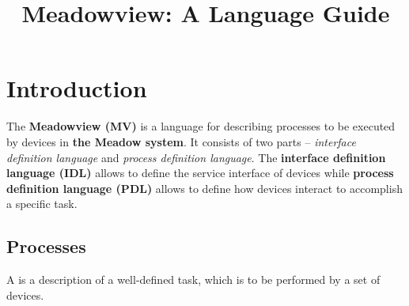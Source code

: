 \documentclass{myproc}
\begin{document}
\small

\title{\large\bf \textcolor{blue2}{Meadowview:  A Language Guide}}  
\date{}
\maketitle

\section{Introduction}


The \textcolor{blue2}{\bf{}Meadowview (MV)} is a language for
describing processes to be executed by devices in \textcolor{blue2}{\bf{}the
  Meadow system}. It consists of two parts -- {\em interface definition
  language\/} and {\em process definition language\/}. The
\textcolor{blue2}{\bf{}interface  definition language (IDL)} allows to define the service interface of devices 
while \textcolor{blue2}{\bf{}process definition language (PDL)} allows to
define how devices interact to accomplish a specific task.


\subsection{Processes}
A  is a description of a well-defined task, which is to be
performed by a set of devices. 
\end{document}
